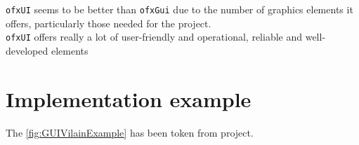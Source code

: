 \documentclass[a4paper,titlepage,oneside]{article}
\begin{document}
\texttt{ofxUI} seems to be better than \texttt{ofxGui} due to the number of graphics elements it offers, particularly those needed for the project.\\\texttt{ofxUI} offers really a lot of user-friendly and operational, reliable and well-developed elements

\newpage
\section{Implementation example}
The \figurename \ref{fig:GUIVilainExample} has been token from \vilain{} project.  

\newpage
\printbibheading
\printbibliography[nottype=online,check=notonline,heading=subbibliography,title={Bibliography}]
\printbibliography[check=online,heading=subbibliography,title={Webography}]
\nocite{openframeworks,ofxUI,REZAALI,OF_TUTORIALS_ofauckland}
\end{document}
